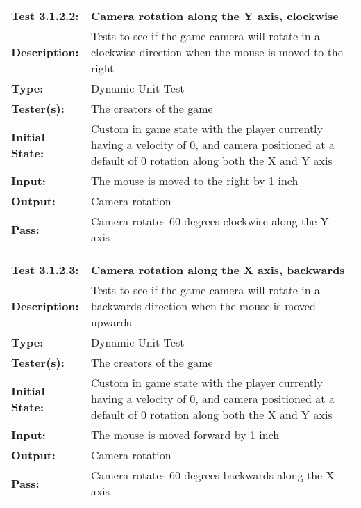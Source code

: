 \documentclass[12pt, titlepage]{article}
\begin{document}
\begin{mdframed}[linewidth=1pt]
\begin{tabularx}{\textwidth}{@{}p{3cm}X@{}}
{\bf Test 3.1.2.2:} & {\bf Camera rotation along the Y axis, clockwise}\\[\baselineskip]
{\bf Description:} & Tests to see if the game camera will rotate in a clockwise direction when the mouse is moved to the right\\[0.5\baselineskip]
{\bf Type:} & Dynamic Unit Test\\[0.5\baselineskip]
{\bf Tester(s):} & The creators of the game\\[0.5\baselineskip]
{\bf Initial State:} & Custom in game state with the player currently having a velocity of 0, and camera positioned at a default of 0 rotation along both the X and Y axis\\[0.5\baselineskip]
{\bf Input:} & The mouse is moved to the right by 1 inch\\[0.5\baselineskip]
{\bf Output:} & Camera rotation\\[0.5\baselineskip]
{\bf Pass:} & Camera rotates 60 degrees clockwise along the Y axis
\end{tabularx}
\end{mdframed}

\begin{mdframed}[linewidth=1pt]
\begin{tabularx}{\textwidth}{@{}p{3cm}X@{}}
{\bf Test 3.1.2.3:} & {\bf Camera rotation along the X axis, backwards}\\[\baselineskip]
{\bf Description:} & Tests to see if the game camera will rotate in a backwards direction when the mouse is moved upwards\\[0.5\baselineskip]
{\bf Type:} & Dynamic Unit Test\\[0.5\baselineskip]
{\bf Tester(s):} & The creators of the game\\[0.5\baselineskip]
{\bf Initial State:} & Custom in game state with the player currently having a velocity of 0, and camera positioned at a default of 0 rotation along both the X and Y axis\\[0.5\baselineskip]
{\bf Input:} & The mouse is moved forward by 1 inch\\[0.5\baselineskip]
{\bf Output:} & Camera rotation\\[0.5\baselineskip]
{\bf Pass:} & Camera rotates 60 degrees backwards along the X axis
\end{tabularx}
\end{mdframed}
\end{document}
